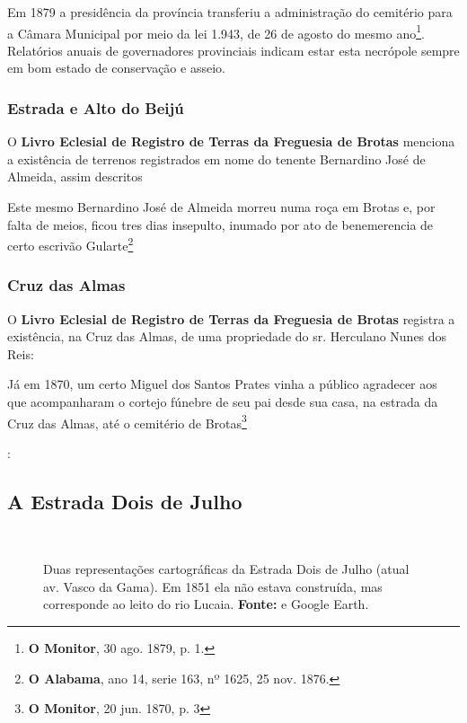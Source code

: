 \begin{citacao}
Em 1879 a presidência da província transferiu a administração do cemitério para a Câmara Municipal por meio da lei 1.943, de 26 de agosto do mesmo ano\footnote{\textbf{O Monitor}, 30 ago. 1879, p. 1.}. Relatórios anuais de governadores provinciais indicam estar esta necrópole sempre em bom estado de conservação e asseio.

\subsubsection{Estrada e Alto do Beijú}



O \textbf{Livro Eclesial de Registro de Terras da Freguesia de Brotas} menciona a existência de terrenos registrados em nome do tenente Bernardino José de Almeida, assim descritos

Este mesmo Bernardino José de Almeida morreu numa roça em Brotas e, por falta de meios, ficou tres dias insepulto, inumado por ato de benemerencia de certo escrivão Gularte\footnote{\textbf{O Alabama}, ano 14, serie 163, nº 1625, 25 nov. 1876.}

\subsubsection{Cruz das Almas}

O \textbf{Livro Eclesial de Registro de Terras da Freguesia de Brotas} registra a existência, na Cruz das Almas, de uma propriedade do sr. Herculano Nunes dos Reis:



Já em 1870, um certo Miguel dos Santos Prates vinha a público agradecer aos que acompanharam o cortejo fúnebre de seu pai desde sua casa, na estrada da Cruz das Almas, até o cemitério de Brotas\footnote{\textbf{O Monitor}, 20 jun. 1870, p. 3}



:





\subsection{A Estrada Dois de Julho}

\begin{figure}[!htp]
\centering
{}
\  %
\caption{Duas representações cartográficas da Estrada Dois de Julho (atual av. Vasco da Gama). Em 1851 ela não estava construída, mas corresponde ao leito do rio Lucaia. \textbf{Fonte:}  e Google Earth.}
\end{figure}


\end{citacao}
